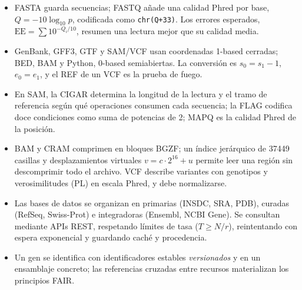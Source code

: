 \begin{resumen}
\begin{itemize}
  \item FASTA guarda secuencias; FASTQ añade una calidad Phred por base, $Q=-10\log_{10}p$, codificada como \texttt{chr(Q+33)}. Los errores esperados, $\mathrm{EE}=\sum 10^{-Q_i/10}$, resumen una lectura mejor que su calidad media.
  \item GenBank, GFF3, GTF y SAM/VCF usan coordenadas 1-based cerradas; BED, BAM y Python, 0-based semiabiertas. La conversión es $s_0=s_1-1$, $e_0=e_1$, y el REF de un VCF es la prueba de fuego.
  \item En SAM, la CIGAR determina la longitud de la lectura y el tramo de referencia según qué operaciones consumen cada secuencia; la FLAG codifica doce condiciones como suma de potencias de 2; MAPQ es la calidad Phred de la posición.
  \item BAM y CRAM comprimen en bloques BGZF; un índice jerárquico de \num{37449} casillas y desplazamientos virtuales $v=c\cdot2^{16}+u$ permite leer una región sin descomprimir todo el archivo. VCF describe variantes con genotipos y verosimilitudes (PL) en escala Phred, y debe normalizarse.
  \item Las bases de datos se organizan en primarias (INSDC, SRA, PDB), curadas (RefSeq, Swiss-Prot) e integradoras (Ensembl, NCBI Gene). Se consultan mediante APIs REST, respetando límites de tasa ($T\ge N/r$), reintentando con espera exponencial y guardando caché y procedencia.
  \item Un gen se identifica con identificadores estables \emph{versionados} y en un ensamblaje concreto; las referencias cruzadas entre recursos materializan los principios FAIR.
\end{itemize}
\end{resumen}

